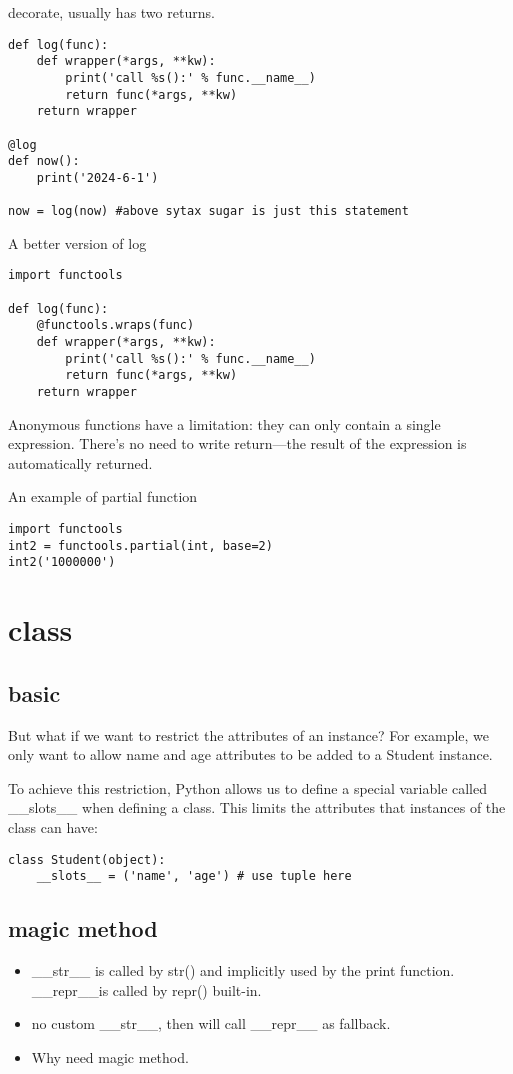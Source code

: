 \documentclass[a4paper,12pt,twoside]{book}
\begin{document}
decorate, usually has two returns. 
\begin{lstlisting}
def log(func):
	def wrapper(*args, **kw):
		print('call %s():' % func.__name__)
		return func(*args, **kw)
	return wrapper
	
@log
def now():
	print('2024-6-1')
	
now = log(now) #above sytax sugar is just this statement
\end{lstlisting}

	A better version of log
\begin{lstlisting}
import functools

def log(func):
	@functools.wraps(func)
	def wrapper(*args, **kw):
		print('call %s():' % func.__name__)
		return func(*args, **kw)
	return wrapper
\end{lstlisting}

	Anonymous functions have a limitation: they can only contain a single expression. There's no need to write return—the result of the expression is automatically returned.
	
	An example of partial function
\begin{lstlisting}
import functools
int2 = functools.partial(int, base=2)
int2('1000000')	
\end{lstlisting}

\chapter{class}
\section{basic}

	
	But what if we want to restrict the attributes of an instance? For example, we only want to allow name and age attributes to be added to a Student instance.
	
	To achieve this restriction, Python allows us to define a special variable called \_\_slots\_\_ when defining a class. This limits the attributes that instances of the class can have:
\begin{lstlisting}
class Student(object):
	__slots__ = ('name', 'age') # use tuple here
\end{lstlisting}
	


\section{magic method}
\begin{itemize}
	\item \_\_str\_\_ is called by str() and implicitly used by the print function. \_\_repr\_\_is called by repr() built-in. 
	\item no custom \_\_str\_\_, then will call \_\_repr\_\_ as fallback. 
	\item Why need magic method. 
\end{itemize}
\end{document}
